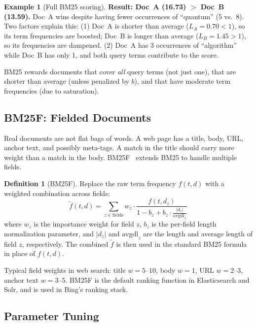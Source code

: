 \documentclass[11pt,a4paper]{article}
\theoremstyle{definition}
\newtheorem{definition}{Definition}[section]
\newtheorem{example}{Example}[section]
\theoremstyle{plain}
\begin{document}
\begin{example}[Full BM25 scoring]
\textbf{Result: Doc~A (16.73) $>$ Doc~B (13.59).} Doc~A wins despite having fewer occurrences of ``quantum'' (5 vs.\ 8). Two factors explain this: (1) Doc~A is shorter than average ($L_A = 0.70 < 1$), so its term frequencies are boosted; Doc~B is longer than average ($L_B = 1.45 > 1$), so its frequencies are dampened. (2) Doc~A has 3 occurrences of ``algorithm'' while Doc~B has only 1, and both query terms contribute to the score.
\end{example}

\begin{keytakeaway}
BM25 rewards documents that cover \emph{all} query terms (not just one), that are shorter than average (unless penalized by $b$), and that have moderate term frequencies (due to saturation).
\end{keytakeaway}

\subsection{BM25F: Fielded Documents}

Real documents are not flat bags of words. A web page has a title, body, URL, anchor text, and possibly meta-tags. A match in the title should carry more weight than a match in the body. BM25F~\cite{robertson2004simple} extends BM25 to handle multiple fields.

\begin{definition}[BM25F]
Replace the raw term frequency $f(t,d)$ with a weighted combination across fields:
\begin{equation}
\tilde{f}(t, d) = \sum_{z \in \text{fields}} w_z \cdot \frac{f(t, d_z)}{1 - b_z + b_z \cdot \frac{|d_z|}{\text{avgdl}_z}}
\end{equation}
where $w_z$ is the importance weight for field $z$, $b_z$ is the per-field length normalization parameter, and $|d_z|$ and $\text{avgdl}_z$ are the length and average length of field $z$, respectively. The combined $\tilde{f}$ is then used in the standard BM25 formula in place of $f(t,d)$.
\end{definition}

Typical field weights in web search: title $w = 5$--$10$, body $w = 1$, URL $w = 2$--$3$, anchor text $w = 3$--$5$. BM25F is the default ranking function in Elasticsearch and Solr, and is used in Bing's ranking stack.

\subsection{Parameter Tuning}
\end{document}
